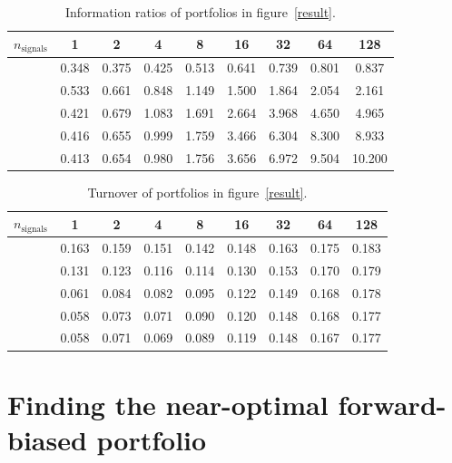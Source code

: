 \documentclass{article}
\begin{document}
    \begin{table}\centering
        \begin{tabular}{l c c c c c c c c}
        $n_\text{signals}$ & 1 & 2 & 4 & 8 & 16 & 32 & 64 & 128  \\ \hline
        & 0.348 & 0.375 & 0.425 & 0.513 & 0.641 & 0.739 & 0.801 & 0.837  \\
        & 0.533 & 0.661 & 0.848 & 1.149 & 1.500 & 1.864 & 2.054 & 2.161  \\
        & 0.421 & 0.679 & 1.083 & 1.691 & 2.664 & 3.968 & 4.650 & 4.965  \\
        & 0.416 & 0.655 & 0.999 & 1.759 & 3.466 & 6.304 & 8.300 & 8.933  \\
        & 0.413 & 0.654 & 0.980 & 1.756 & 3.656 & 6.972 & 9.504 & 10.200 
        \end{tabular}
        \caption{Information ratios of portfolios in figure~\ref{result}.}
        \label{table:ir}
    \end{table}


    \begin{table}\centering
        \begin{tabular}{l c c c c c c c c}
        $n_\text{signals}$ & 1 & 2 & 4 & 8 & 16 & 32 & 64 & 128  \\ \hline
        & 0.163 & 0.159 & 0.151 & 0.142 & 0.148 & 0.163 & 0.175 & 0.183  \\
        & 0.131 & 0.123 & 0.116 & 0.114 & 0.130 & 0.153 & 0.170 & 0.179  \\
        & 0.061 & 0.084 & 0.082 & 0.095 & 0.122 & 0.149 & 0.168 & 0.178  \\
        & 0.058 & 0.073 & 0.071 & 0.090 & 0.120 & 0.148 & 0.168 & 0.177  \\
        & 0.058 & 0.071 & 0.069 & 0.089 & 0.119 & 0.148 & 0.167 & 0.177 
        \end{tabular}
        \caption{Turnover of portfolios in figure~\ref{result}.}
        \label{table:tvr}
    \end{table}

 \clearpage
\section{Finding the near-optimal forward-biased portfolio}
\end{document}
